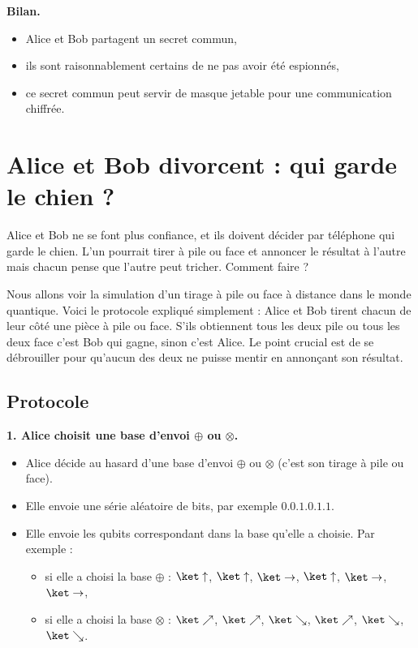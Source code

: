 \documentclass[11pt,class=report,crop=false]{standalone}
\begin{document}
\textbf{Bilan.}
\begin{itemize}
  \item Alice et Bob partagent un secret commun,
  \item ils sont raisonnablement certains de ne pas avoir été espionnés,
  \item ce secret commun peut servir de masque jetable pour une communication chiffrée.
\end{itemize}

\section{Alice et Bob divorcent : qui garde le chien ?}

Alice et Bob ne se font plus confiance, et ils doivent décider par téléphone qui garde le chien. L'un pourrait tirer à pile ou face et annoncer le résultat à l'autre mais chacun pense que l'autre peut tricher. Comment faire ?

Nous allons voir la simulation d'un tirage à pile ou face à distance dans le monde quantique. Voici le protocole expliqué simplement : Alice et Bob tirent chacun de leur côté une pièce à pile ou face. S'ils obtiennent tous les deux \og{}pile\fg{} ou tous les deux \og{}face\fg{} c'est Bob qui gagne, sinon c'est Alice. Le point crucial est de se débrouiller pour qu'aucun des deux ne puisse mentir en annonçant son résultat.

\subsection{Protocole}

\textbf{1. Alice choisit une base d'envoi $\oplus$ ou $\otimes$.}

\begin{itemize}
  \item Alice décide au hasard d'une base d'envoi $\oplus$ ou $\otimes$ (c'est son tirage à pile ou face).
  \item Elle envoie une série aléatoire de bits, par exemple $0.0.1.0.1.1$.
  \item Elle envoie les qubits correspondant dans la base qu'elle a choisie. Par exemple :
  \begin{itemize}
    \item si elle a choisi la base $\oplus$ : $\ket\uparrow$, $\ket\uparrow$, $\ket\rightarrow$, $\ket\uparrow$, $\ket\rightarrow$, $\ket\rightarrow$,
    \item si elle a choisi la base $\otimes$ : $\ket\nearrow$, $\ket\nearrow$, $\ket\searrow$, $\ket\nearrow$, $\ket\searrow$, $\ket\searrow$.
  \end{itemize}
\end{itemize}  
\end{document}
